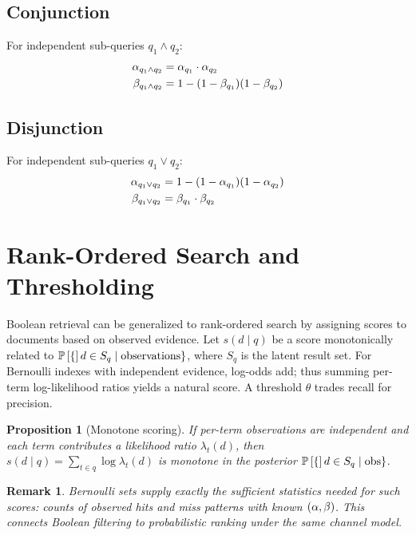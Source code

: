 \documentclass[11pt,final,hidelinks]{article}
\newtheorem{proposition}[theorem]{Proposition}
\newtheorem{remark}[theorem]{Remark}
\begin{document}
\subsection{Conjunction}

For independent sub-queries $q_1 \land q_2$:
\begin{align}
\alpha_{q_1 \land q_2} &= \alpha_{q_1} \cdot \alpha_{q_2} \\
\beta_{q_1 \land q_2} &= 1 - (1 - \beta_{q_1})(1 - \beta_{q_2})
\end{align}

\subsection{Disjunction}

For independent sub-queries $q_1 \lor q_2$:
\begin{align}
\alpha_{q_1 \lor q_2} &= 1 - (1 - \alpha_{q_1})(1 - \alpha_{q_2}) \\
\beta_{q_1 \lor q_2} &= \beta_{q_1} \cdot \beta_{q_2}
\end{align}

\section{Rank-Ordered Search and Thresholding}

Boolean retrieval can be generalized to rank-ordered search by assigning scores to documents based on observed evidence. Let $s(d\mid q)$ be a score monotonically related to $\mathbb{P}\left[\{\right]d\in S_q \mid \text{observations}\}$, where $S_q$ is the latent result set. For Bernoulli indexes with independent evidence, log-odds add; thus summing per-term log-likelihood ratios yields a natural score. A threshold $\theta$ trades recall for precision.

\begin{proposition}[Monotone scoring]
If per-term observations are independent and each term contributes a likelihood ratio $\lambda_t(d)$, then $s(d\mid q)=\sum_{t\in q} \log \lambda_t(d)$ is monotone in the posterior $\mathbb{P}\left[\{\right]d\in S_q\mid\text{obs}\}$.
\end{proposition}

\begin{remark}
Bernoulli sets supply exactly the sufficient statistics needed for such scores: counts of observed hits and miss patterns with known $(\alpha,\beta)$. This connects Boolean filtering to probabilistic ranking under the same channel model.
\end{remark}
\end{document}
